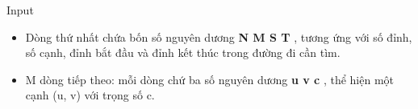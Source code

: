 Input
\begin{itemize}
	\item     Dòng thứ nhất chứa bốn số nguyên dương    \textbf{     N M S T    }    , tương ứng với số đỉnh, số cạnh, đỉnh bắt đầu và đỉnh kết thúc trong đường đi cần tìm.   
	\item     M dòng tiếp theo: mỗi dòng chứ ba số nguyên dương    \textbf{     u v c    }    , thể hiện một cạnh (u, v) với trọng số c.   
\end{itemize}